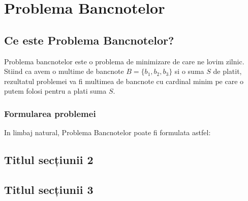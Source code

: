 \chapter{Problema Bancnotelor}

\section{Ce este Problema Bancnotelor?}

Problema bancnotelor este o problema de minimizare de care ne lovim zilnic. Stiind ca avem o  multime de bancnote $ B = \{ b_1, b_2, b_3\}$ si o suma $S$ de platit, rezultatul problemei va fi multimea de bancnote cu cardinal minim pe care o putem folosi pentru a plati suma $S$.

\subsection{Formularea problemei}

In limbaj natural, Problema Bancnotelor poate fi formulata astfel:
\par
\vspace{0.5cm}

\section{Titlul secțiunii 2}


\section{Titlul secțiunii 3}
